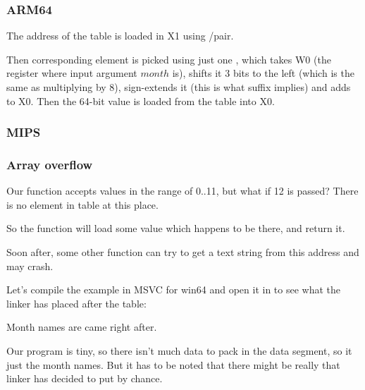\subsubsection{ARM64}




The address of the table is loaded in X1 using \ADRP/\ADD pair.

Then corresponding element is picked using just one \LDR, which takes W0 
(the register where input argument $month$ is), shifts it 3 bits to the left (which is the same as multiplying by 8), 
sign-extends it (this is what  suffix implies) and adds to X0.
Then the 64-bit value is loaded from the table into X0.

\subsubsection{MIPS}



\subsubsection{Array overflow}

Our function accepts values in the range of 0..11, but what if 12 is passed?
There is no element in table at this place.

So the function will load some value which happens to be there, and return it.

Soon after, some other function can try to get a text string from this address and may crash.

Let's compile the example in MSVC for win64 and open it in \IDA to see what the linker has placed after the table:



Month names are came right after.

Our program is tiny, so there isn't much data to pack in the data segment, 
so it just the month names.
But it has to be noted that there might be really  that linker has decided to put by chance.

